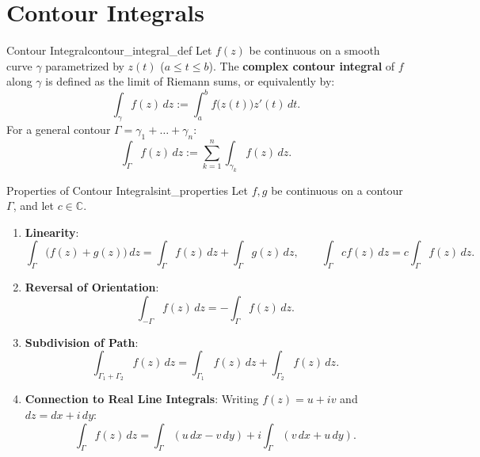 \section{Contour Integrals}

\begin{definition}{Contour Integral}{contour_integral_def}
Let $f(z)$ be continuous on a smooth curve $\gamma$ parametrized by $z(t)$ ($a \le t \le b$). The \textbf{complex contour integral} of $f$ along $\gamma$ is defined as the limit of Riemann sums, or equivalently by:
\begin{equation}
\int_\gamma f(z)\, dz := \int_a^b f\big(z(t)\big) z'(t)\, dt.
\end{equation}
For a general contour $\Gamma = \gamma_1 + \dots + \gamma_n$:
\begin{equation}
\int_\Gamma f(z)\, dz := \sum_{k=1}^n \int_{\gamma_k} f(z)\, dz.
\end{equation}
\end{definition}

\begin{proposition}{Properties of Contour Integrals}{int_properties}
Let $f, g$ be continuous on a contour $\Gamma$, and let $c \in \mathbb{C}$.
\begin{enumerate}
    \item \textbf{Linearity}:
    \begin{equation}
    \int_\Gamma \big(f(z) + g(z)\big)\, dz = \int_\Gamma f(z)\, dz + \int_\Gamma g(z)\, dz, \qquad \int_\Gamma c f(z)\, dz = c \int_\Gamma f(z)\, dz.
    \end{equation}
    \item \textbf{Reversal of Orientation}:
    \begin{equation}
    \int_{-\Gamma} f(z)\, dz = -\int_\Gamma f(z)\, dz.
    \end{equation}
    \item \textbf{Subdivision of Path}:
    \begin{equation}
    \int_{\Gamma_1 + \Gamma_2} f(z)\, dz = \int_{\Gamma_1} f(z)\, dz + \int_{\Gamma_2} f(z)\, dz.
    \end{equation}
    \item \textbf{Connection to Real Line Integrals}: Writing $f(z) = u + iv$ and $dz = dx + i\,dy$:
    \begin{equation}
    \int_\Gamma f(z)\, dz = \int_\Gamma (u\, dx - v\, dy) + i \int_\Gamma (v\, dx + u\, dy).
    \end{equation}
\end{enumerate}
\end{proposition}

